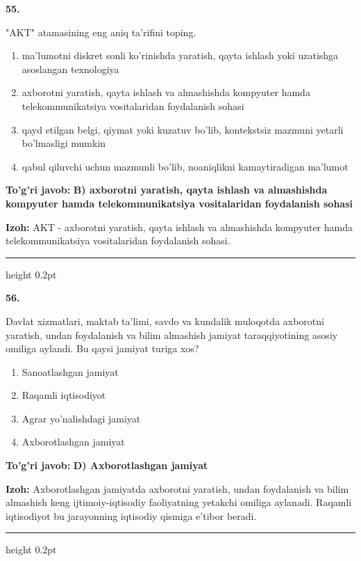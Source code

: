 \documentclass[10pt,a4paper,oneside]{article}
\begin{document}
\noindent\textbf{\color{ink}55.}
\par
"AKT" atamasining eng aniq ta'rifini toping.
\begin{enumerate}[label=\Alph*),leftmargin=9mm]
\item ma'lumotni diskret sonli ko'rinishda yaratish, qayta ishlash yoki uzatishga asoslangan texnologiya
\item axborotni yaratish, qayta ishlash va almashishda kompyuter hamda telekommunikatsiya vositalaridan foydalanish sohasi
\item qayd etilgan belgi, qiymat yoki kuzatuv bo'lib, kontekstsiz mazmuni yetarli bo'lmasligi mumkin
\item qabul qiluvchi uchun mazmunli bo'lib, noaniqlikni kamaytiradigan ma'lumot
\end{enumerate}
\begin{tcolorbox}[enhanced,breakable,colback=teal!4,colframe=teal!50!black,boxrule=0.5pt,arc=1.1mm,left=3mm,right=3mm,top=1.7mm,bottom=1.7mm,before skip=2mm,after skip=2mm]
\textbf{\color{teal}To'g'ri javob:} \textbf{B) axborotni yaratish, qayta ishlash va almashishda kompyuter hamda telekommunikatsiya vositalaridan foydalanish sohasi}
\par\smallskip
\textbf{Izoh:} AKT - axborotni yaratish, qayta ishlash va almashishda kompyuter hamda telekommunikatsiya vositalaridan foydalanish sohasi.
\end{tcolorbox}
\vspace{2mm}\hrule height 0.2pt \vspace{3mm}

\noindent\textbf{\color{ink}56.}
\par
Davlat xizmatlari, maktab ta'limi, savdo va kundalik muloqotda axborotni yaratish, undan foydalanish va bilim almashish jamiyat taraqqiyotining asosiy omiliga aylandi. Bu qaysi jamiyat turiga xos?
\begin{enumerate}[label=\Alph*),leftmargin=9mm]
\item Sanoatlashgan jamiyat
\item Raqamli iqtisodiyot
\item Agrar yo'nalishdagi jamiyat
\item Axborotlashgan jamiyat
\end{enumerate}
\begin{tcolorbox}[enhanced,breakable,colback=teal!4,colframe=teal!50!black,boxrule=0.5pt,arc=1.1mm,left=3mm,right=3mm,top=1.7mm,bottom=1.7mm,before skip=2mm,after skip=2mm]
\textbf{\color{teal}To'g'ri javob:} \textbf{D) Axborotlashgan jamiyat}
\par\smallskip
\textbf{Izoh:} Axborotlashgan jamiyatda axborotni yaratish, undan foydalanish va bilim almashish keng ijtimoiy-iqtisodiy faoliyatning yetakchi omiliga aylanadi. Raqamli iqtisodiyot bu jarayonning iqtisodiy qismiga e'tibor beradi.
\end{tcolorbox}
\vspace{2mm}\hrule height 0.2pt \vspace{3mm}
\end{document}
